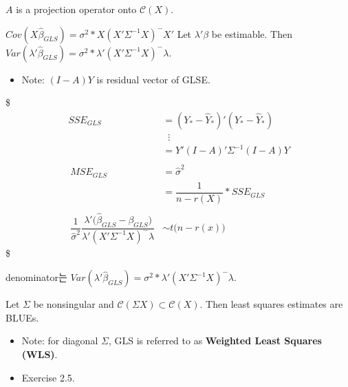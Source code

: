 \documentclass[
]{book}
\providecommand{\tightlist}{%
  \setlength{\itemsep}{0pt}\setlength{\parskip}{0pt}}
\begin{document}
{{{\(A\) is a projection operator onto \(\mathcal{C}(X)\).

\(Cov(X \hat \beta_{GLS}) = \sigma^2 \ast X(X' \Sigma^{-1} X)^{-}X'\)
Let \(\lambda ' \beta\) be estimable. Then \(Var(\lambda ' \hat \beta_{GLS}) = \sigma^2 \ast \lambda ' (X' \Sigma^{-1} X)^- \lambda\).

\begin{itemize}
\tightlist
\item
  Note: \((I-A)Y\) is residual vector of GLSE.
\end{itemize}

\$
\begin{align}

SSE_{GLS} &= (Y_\ast - \hat Y_\ast)' (Y_\ast - \hat Y_\ast) \\

&\; \; \vdots \\

&= Y'(I-A)' \Sigma^{-1}(I-A)Y \\

\\\

MSE_{GLS} &= \hat \sigma^2 \\
& = \dfrac{1}{n-r(X)} \ast SSE_{GLS}\\

\\\

\dfrac{1}{\hat \sigma^2}

\dfrac{\lambda' \Big(\hat \beta_{GLS} - \beta_{GLS} \Big)}{ \lambda ' (X' \Sigma^{-1} X)^- \lambda} &\sim t\Big( n-r(x) \Big)





\end{align}
\$

denominator는 \(Var(\lambda ' \hat \beta_{GLS}) = \sigma^2 \ast \lambda ' (X' \Sigma^{-1} X)^- \lambda\).

Let \(\Sigma\) be nonsingular and \(\mathcal{C}(\Sigma X) \subset \mathcal{C}(X)\). Then least squares estimates are BLUEs.

\begin{itemize}
\tightlist
\item
  Note: for diagonal \(\Sigma\), GLS is referred to as \textbf{Weighted Least Squares (WLS)}.
\end{itemize}

\begin{itemize}
\tightlist
\item
  Exercise 2.5.
\end{itemize}

}}}
\end{document}
